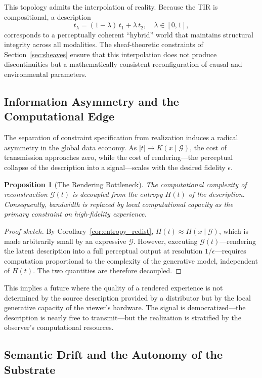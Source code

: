 \documentclass[11pt,a4paper]{article}
\newtheorem{proposition}[theorem]{Proposition}
\theoremstyle{definition}
\theoremstyle{remark}
\begin{document}
This topology admits the interpolation of reality. Because the TIR is compositional, a description
\[
t_{\lambda} = (1-\lambda)\, t_1 + \lambda\, t_2, \quad \lambda \in [0,1],
\]
corresponds to a perceptually coherent ``hybrid'' world that maintains structural integrity across all modalities. The sheaf-theoretic constraints of Section~\ref{sec:sheaves} ensure that this interpolation does not produce discontinuities but a mathematically consistent reconfiguration of causal and environmental parameters.

\subsection{Information Asymmetry and the Computational Edge}

The separation of constraint specification from realization induces a radical asymmetry in the global data economy. As $|t| \rightarrow K(x \mid \mathcal{G})$, the cost of transmission approaches zero, while the cost of rendering---the perceptual collapse of the description into a signal---scales with the desired fidelity $\epsilon$.

\begin{proposition}[The Rendering Bottleneck]
The computational complexity of reconstruction $\mathcal{G}(t)$ is decoupled from the entropy $H(t)$ of the description. Consequently, bandwidth is replaced by local computational capacity as the primary constraint on high-fidelity experience.
\end{proposition}

\begin{proof}[Proof sketch]
By Corollary~\ref{cor:entropy_redist}, $H(t) \approx H(x \mid \mathcal{G})$, which is made arbitrarily small by an expressive $\mathcal{G}$. However, executing $\mathcal{G}(t)$---rendering the latent description into a full perceptual output at resolution $1/\epsilon$---requires computation proportional to the complexity of the generative model, independent of $H(t)$. The two quantities are therefore decoupled.
\end{proof}

This implies a future where the quality of a rendered experience is not determined by the source description provided by a distributor but by the local generative capacity of the viewer's hardware. The signal is democratized---the description is nearly free to transmit---but the realization is stratified by the observer's computational resources.

\subsection{Semantic Drift and the Autonomy of the Substrate}
\end{document}

